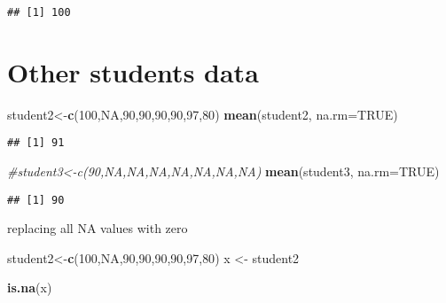 \documentclass[
]{article}
\newenvironment{Shaded}{\begin{snugshade}}{\end{snugshade}}
\newcommand{\AttributeTok}[1]{\textcolor[rgb]{0.13,0.29,0.53}{#1}}
\newcommand{\CommentTok}[1]{\textcolor[rgb]{0.56,0.35,0.01}{\textit{#1}}}
\newcommand{\ConstantTok}[1]{\textcolor[rgb]{0.56,0.35,0.01}{#1}}
\newcommand{\DecValTok}[1]{\textcolor[rgb]{0.00,0.00,0.81}{#1}}
\newcommand{\FunctionTok}[1]{\textcolor[rgb]{0.13,0.29,0.53}{\textbf{#1}}}
\newcommand{\NormalTok}[1]{#1}
\newcommand{\OtherTok}[1]{\textcolor[rgb]{0.56,0.35,0.01}{#1}}
\begin{document}
\begin{verbatim}
## [1] 100
\end{verbatim}

\hypertarget{other-students-data}{%
\section{Other students data}\label{other-students-data}}

\begin{Shaded}
\begin{Highlighting}[]
\NormalTok{student2}\OtherTok{\textless{}{-}}\FunctionTok{c}\NormalTok{(}\DecValTok{100}\NormalTok{,}\ConstantTok{NA}\NormalTok{,}\DecValTok{90}\NormalTok{,}\DecValTok{90}\NormalTok{,}\DecValTok{90}\NormalTok{,}\DecValTok{90}\NormalTok{,}\DecValTok{97}\NormalTok{,}\DecValTok{80}\NormalTok{)}
\FunctionTok{mean}\NormalTok{(student2, }\AttributeTok{na.rm=}\ConstantTok{TRUE}\NormalTok{)}
\end{Highlighting}
\end{Shaded}

\begin{verbatim}
## [1] 91
\end{verbatim}

\begin{Shaded}
\begin{Highlighting}[]
\CommentTok{\#student3\textless{}{-}c(90,NA,NA,NA,NA,NA,NA,NA)}
\FunctionTok{mean}\NormalTok{(student3, }\AttributeTok{na.rm=}\ConstantTok{TRUE}\NormalTok{)}
\end{Highlighting}
\end{Shaded}

\begin{verbatim}
## [1] 90
\end{verbatim}

replacing all NA values with zero

\begin{Shaded}
\begin{Highlighting}[]
\NormalTok{student2}\OtherTok{\textless{}{-}}\FunctionTok{c}\NormalTok{(}\DecValTok{100}\NormalTok{,}\ConstantTok{NA}\NormalTok{,}\DecValTok{90}\NormalTok{,}\DecValTok{90}\NormalTok{,}\DecValTok{90}\NormalTok{,}\DecValTok{90}\NormalTok{,}\DecValTok{97}\NormalTok{,}\DecValTok{80}\NormalTok{)}
\NormalTok{x }\OtherTok{\textless{}{-}}\NormalTok{ student2}

\FunctionTok{is.na}\NormalTok{(x)}
\end{Highlighting}
\end{Shaded}
\end{document}
